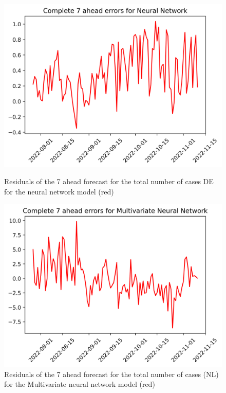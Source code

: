 \begin{figure}

\begin{minipage}{.32\textwidth}
  \centering
  \includegraphics[width=\linewidth]{pics/7_ah/DE_7_ahead_errors_Neural Network.png}
  \caption{Residuals of the 7 ahead forecast for the total number of cases DE for the neural network model (red)}
  \label{fig:tot_cases_error_7_nn_DE}
\end{minipage}
\begin{minipage}{.32\textwidth}
  \centering
  \includegraphics[width=\linewidth]{pics/7_ah/7_ahead_errors_Multivariate Neural Network.png}
  \caption{Residuals of the 7 ahead forecast for the total number of cases (NL) for the Multivariate neural network model (red)}

\end{minipage}
\end{figure}
